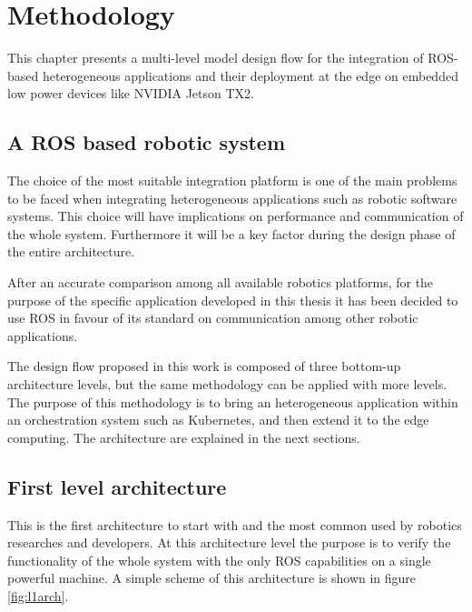 \chapter{Methodology} \label{chap:methodology}

This chapter presents a multi-level model design flow for the integration of ROS-based heterogeneous applications and their deployment at the edge on embedded low power devices like NVIDIA Jetson TX2.


\section{A ROS based robotic system}
The choice of the most suitable integration platform is one of the main problems to be faced when integrating heterogeneous applications such as robotic software systems. This choice will have implications on performance and communication of the whole system. Furthermore it will be a key factor during the design phase of the entire architecture.

After an accurate comparison among all available robotics platforms, for the purpose of the specific application developed in this thesis it has been decided to use ROS \cite{ROS} in favour of its standard on communication among other robotic applications.


The design flow proposed in this work is composed of three bottom-up architecture levels, but the same methodology can be applied with more levels.
The purpose of this methodology is to bring an heterogeneous application within an orchestration system such as Kubernetes, and then extend it to the edge computing. %
The architecture are explained in the next sections.




\section{First level architecture}
This is the first architecture to start with and the most common used by robotics researches and developers.
At this architecture level the purpose is to verify the functionality of the whole system with the only ROS capabilities on a single powerful machine. A simple scheme of this architecture is shown in figure \ref{fig:l1arch}.

